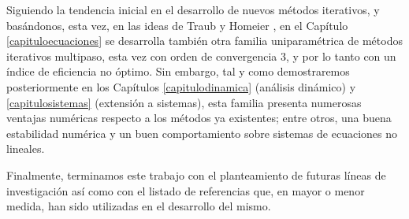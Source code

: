 Siguiendo la tendencia inicial en el desarrollo de nuevos métodos iterativos, y basándonos, esta vez, en las ideas de Traub \cite{TR} y Homeier \cite{Ho}, en el Capítulo \ref{capituloecuaciones} se desarrolla también otra familia uniparamétrica de métodos iterativos multipaso, esta vez con orden de convergencia 3, y por lo tanto con un índice de eficiencia no óptimo. Sin embargo, tal y como demostraremos posteriormente en los Capítulos \ref{capitulodinamica} (análisis dinámico) y \ref{capitulosistemas} (extensión a sistemas), esta familia presenta numerosas ventajas numéricas respecto a los métodos ya existentes; entre otros, una buena estabilidad numérica y un buen comportamiento sobre sistemas de ecuaciones no lineales.


Finalmente, terminamos este trabajo con el planteamiento de futuras líneas de investigación así como con el listado de referencias que, en mayor o menor medida, han sido utilizadas en el desarrollo del mismo.